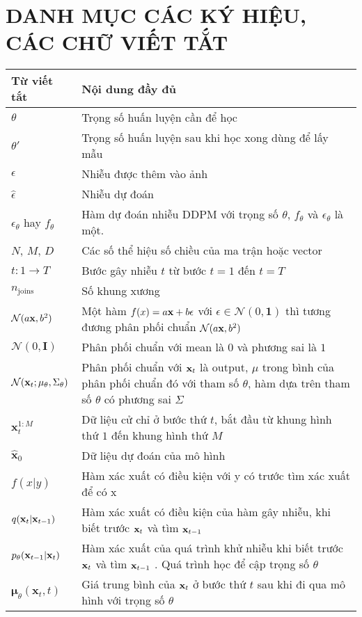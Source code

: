 
\pagebreak
{}
{}
\section*{\textbf{ \Large DANH MỤC CÁC KÝ HIỆU, CÁC CHỮ VIẾT TẮT}}

\begin{center}
\begin{tabular}{|p{3cm}|p{11cm}|}
\hline
\textbf{Từ viết tắt} & \textbf{Nội dung đầy đủ} \\
\hline
$\theta$ & Trọng số huấn luyện cần để học \\
\hline
$\theta'$ & Trọng số huấn luyện sau khi học xong dùng để lấy mẫu \\
\hline
$\epsilon$ & Nhiễu được thêm vào ảnh \\
\hline
$\hat{\epsilon}$ & Nhiễu dự đoán\\
\hline
$\epsilon_\theta$ hay $f_\theta$ & Hàm dự đoán nhiễu DDPM với trọng số $\theta$, $f_\theta$ và $\epsilon_\theta$ là một. \\
\hline
$N$, $M$, $D$ & Các số thể hiệu số chiều của ma trận hoặc vector \\
\hline
$t: 1 \rightarrow T$ & Bước gây nhiễu $t$ từ bước $t=1$ đến $t=T$ \\
\hline
$n_{\operatorname{joins}}$ & Số khung xương \\
\hline
$\mathcal{N}(a \mathbf{x}, b^2)$ & Một hàm $f(x) = a \mathbf{x} + b \epsilon$ với $\epsilon \in \mathcal{N}(0, \mathbf{1})$ thì tương đương phân phối chuẩn $\mathcal{N}(a \mathbf{x}, b^2)$ \\
\hline
$\mathcal{N}(0, \mathbf{I})$ & Phân phối chuẩn với mean là $0$ và phương sai là $1$ \\
\hline
$\mathcal{N}(\mathbf{x}_t; \mu_\theta, \Sigma_\theta)$ & Phân phối chuẩn với $\mathbf{x}_t$ là output, $\mu$ trong bình của phân phối chuẩn đó với tham số $\theta$,  hàm dựa trên tham số $\theta$ có phương sai  $\Sigma$ \\ 
\hline
$\mathbf{x}_{t}^{1:M}$ & Dữ liệu cử chỉ ở bước thứ $t$, bắt đầu từ khung hình thứ $1$ đến khung hình thứ $M$ \\
\hline
$\hat{\mathbf{x}}_0$ &  Dữ liệu dự đoán của mô hình \\
\hline
$f(x | y)$ & Hàm xác xuất có điều kiện với y có trước tìm xác xuất để có x \\
\hline
$q(\mathbf{x}_t | \mathbf{x}_{t-1})$ & Hàm xác xuất có điều kiện của hàm gây nhiễu, khi biết trước $\mathbf{x}_t$ và tìm $\mathbf{x}_{t-1}$  \\
\hline
$p_{\theta} (\mathbf{x}_{t-1} | \mathbf{x}_{t})$ & Hàm xác xuất của quá trình khử nhiễu khi biết trước $\mathbf{x}_{t}$ và tìm $\mathbf{x}_{t-1}$ . Quá trình học để cập trọng số $\theta$   \\
\hline
$\boldsymbol{\mu}_\theta(\mathbf{x}_t, t)$ & Giá trung bình của $\mathbf{x}_t$ ở bước thứ $t$ sau khi đi qua mô hình với trọng số $\theta$ \\
\hline


\end{tabular}
\end{center}
